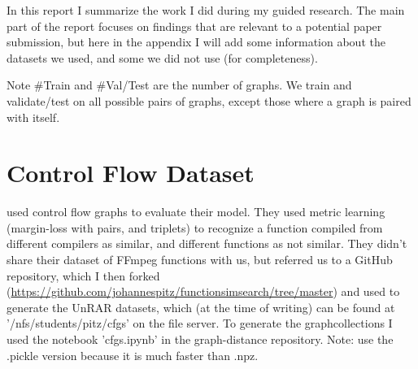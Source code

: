\appendix
\appendixpage

In this report I summarize the work I did during my guided research. The main part of the report focuses on findings that are relevant to a potential paper submission, but here in the appendix I will add some information about the datasets we used, and some we did not use (for completeness).



Note \#Train and \#Val/Test are the number of graphs. We train and validate/test on all possible pairs of graphs, except those where a graph is paired with itself.

\section{Control Flow Dataset}
\label{appendix:CFG}

\cite{li2019} used control flow graphs to evaluate their model. They used metric learning (margin-loss with pairs, and triplets) to recognize a function compiled from different compilers as similar, and different functions as not similar. They didn't share their dataset of FFmpeg functions with us, but referred us to a GitHub repository, which I then forked (\url{https://github.com/johannespitz/functionsimsearch/tree/master}) and used to generate the UnRAR datasets, which (at the time of writing) can be found at '/nfs/students/pitz/cfgs' on the file server. To generate the graphcollections I used the notebook 'cfgs.ipynb' in the graph-distance repository. Note: use the .pickle version because it is much faster than .npz.

